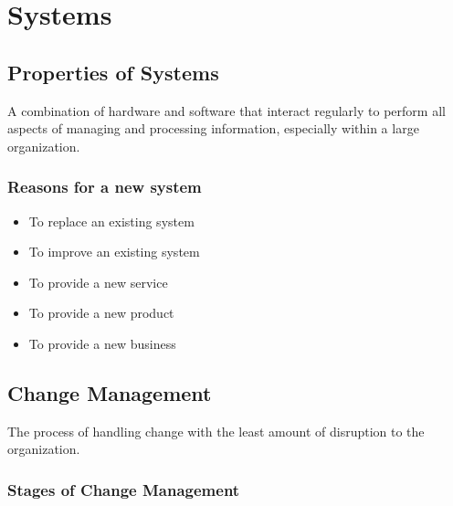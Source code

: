 \documentclass[12pt,fleqn]{book} %
\begin{document}
\chapter{Systems}

\section{Properties of Systems}

\begin{definition}[System]
    A combination of hardware and software that interact regularly to perform 
    all aspects of managing and processing information, especially within a 
    large organization.
\end{definition}\par

\subsection{Reasons for a new system}
\begin{itemize}
  \item To replace an existing system
  \item To improve an existing system
  \item To provide a new service
  \item To provide a new product
  \item To provide a new business
\end{itemize}

\section{Change Management}
\begin{definition}
  The process of handling change with the least amount of disruption to the
  organization.
\end{definition}\par

\subsection{Stages of Change Management}

\begin{center}
\end{center}
\end{document}
